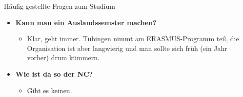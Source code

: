 \begin{block}{Häufig gestellte Fragen zum Studium}
\begin{large}
\begin{itemize}
\item \textbf{Kann man ein Auslandssemster machen?}
\begin{itemize}
	\item  Klar, geht immer. Tübingen nimmt am ERASMUS-Programm teil, die Organisation ist aber langwierig und man sollte sich früh (ein Jahr vorher) drum kümmern.
\end{itemize}

\item \textbf{Wie ist da so der NC?}
\begin{itemize}
	\item Gibt es keinen.
\end{itemize}
	\end{itemize}
\end{large}
\end{block}